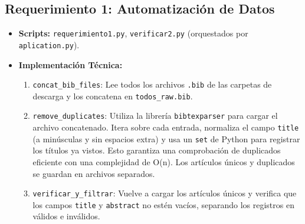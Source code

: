 \documentclass[a4paper, 11pt]{article}
\begin{document}
\subsection{Requerimiento 1: Automatización de Datos}
\begin{itemize}
    \item \textbf{Scripts:} \texttt{requerimiento1.py}, \texttt{verificar2.py} (orquestados por \texttt{aplication.py}).
    \item \textbf{Implementación Técnica:}
    \begin{enumerate}
        \item \texttt{concat_bib_files}: Lee todos los archivos \texttt{.bib} de las carpetas de descarga y los concatena en \texttt{todos_raw.bib}.
        \item \texttt{remove_duplicates}: Utiliza la librería \texttt{bibtexparser} para cargar el archivo concatenado. Itera sobre cada entrada, normaliza el campo \texttt{title} (a minúsculas y sin espacios extra) y usa un \texttt{set} de Python para registrar los títulos ya vistos. Esto garantiza una comprobación de duplicados eficiente con una complejidad de O(n). Los artículos únicos y duplicados se guardan en archivos separados.
        \item \texttt{verificar_y_filtrar}: Vuelve a cargar los artículos únicos y verifica que los campos \texttt{title} y \texttt{abstract} no estén vacíos, separando los registros en válidos e inválidos.
    \end{enumerate}
\end{itemize}
\end{document}
